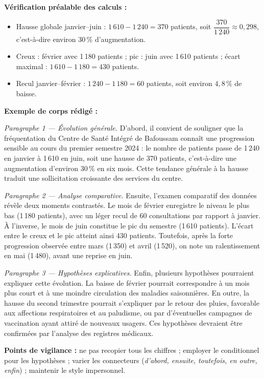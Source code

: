 \documentclass[11pt]{article}
\begin{document}
\begin{corrige}
\textbf{Vérification préalable des calculs :}
\begin{itemize}
    \item Hausse globale janvier--juin : $1\,610 - 1\,240 = 370$ patients, soit $\dfrac{370}{1\,240} \approx 0{,}298$, c'est-à-dire environ $30\,\%$ d'augmentation.
    \item Creux : février avec 1\,180 patients ; pic : juin avec 1\,610 patients ; écart maximal : $1\,610 - 1\,180 = 430$ patients.
    \item Recul janvier--février : $1\,240 - 1\,180 = 60$ patients, soit environ $4{,}8\,\%$ de baisse.
\end{itemize}

\textbf{Exemple de corps rédigé :}

\emph{Paragraphe 1 — Évolution générale.} D'abord, il convient de souligner que la fréquentation du Centre de Santé Intégré de Bafoussam connaît une progression sensible au cours du premier semestre 2024 : le nombre de patients passe de 1\,240 en janvier à 1\,610 en juin, soit une hausse de 370 patients, c'est-à-dire une augmentation d'environ 30\,\% en six mois. Cette tendance générale à la hausse traduit une sollicitation croissante des services du centre.

\emph{Paragraphe 2 — Analyse comparative.} Ensuite, l'examen comparatif des données révèle deux moments contrastés. Le mois de février enregistre le niveau le plus bas (1\,180 patients), avec un léger recul de 60 consultations par rapport à janvier. À l'inverse, le mois de juin constitue le pic du semestre (1\,610 patients). L'écart entre le creux et le pic atteint ainsi 430 patients. Toutefois, après la forte progression observée entre mars (1\,350) et avril (1\,520), on note un ralentissement en mai (1\,480), avant une reprise en juin.

\emph{Paragraphe 3 — Hypothèses explicatives.} Enfin, plusieurs hypothèses pourraient expliquer cette évolution. La baisse de février pourrait correspondre à un mois plus court et à une moindre circulation des maladies saisonnières. En outre, la hausse du second trimestre pourrait s'expliquer par le retour des pluies, favorable aux affections respiratoires et au paludisme, ou par d'éventuelles campagnes de vaccination ayant attiré de nouveaux usagers. Ces hypothèses devraient être confirmées par l'analyse des registres médicaux.

\textbf{Points de vigilance :} ne pas recopier tous les chiffres ; employer le conditionnel pour les hypothèses ; varier les connecteurs (\emph{d'abord, ensuite, toutefois, en outre, enfin}) ; maintenir le style impersonnel.
\end{corrige}
\end{document}
